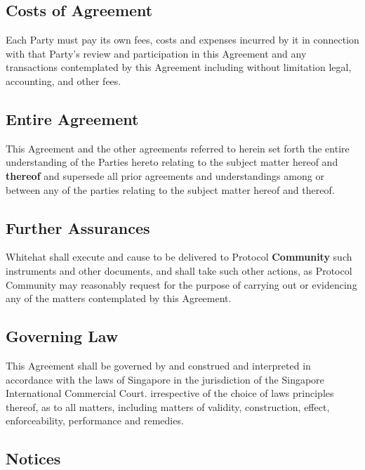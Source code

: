 \documentclass{article}
\begin{document}
\subsection{Costs of Agreement}\label{subsec:costs}

Each Party must pay its own fees, costs and expenses incurred by it in connection with that Party's review and participation in this Agreement and any transactions contemplated by this Agreement including without limitation legal, accounting, and other fees.

\subsection{Entire Agreement}\label{subsec:entire_agreement}

This Agreement and the other agreements referred to herein set forth the entire understanding of the Parties hereto relating to the subject matter hereof and \textbf{thereof} and supersede all prior agreements and understandings among or between any of the parties relating to the subject matter hereof and thereof.

\subsection{Further Assurances}\label{subsec:further_assurances}

Whitehat shall execute and cause to be delivered to Protocol \textbf{Community} such instruments and other documents, and shall take such other actions, as Protocol Community may reasonably request for the purpose of carrying out or evidencing any of the matters contemplated by this Agreement.

\subsection{Governing Law}\label{subsec:governing_law}

This Agreement shall be governed by and construed and interpreted in accordance with the laws of Singapore in the jurisdiction of the Singapore International Commercial Court. irrespective of the choice of laws principles thereof, as to all matters, including matters of validity, construction, effect, enforceability, performance and remedies.

\subsection{Notices}\label{subsec:notices}
\end{document}
